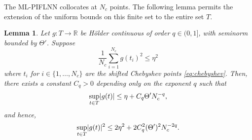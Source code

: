 \documentclass[11pt, a4paper]{article}
\theoremstyle{theoremstyle}
\newtheorem{lemma}[theorem]{Lemma}
\theoremstyle{definitionstyle}
\DeclarePairedDelimiter{\abs}{\lvert}{\rvert}
\begin{document}
The ML-PIFLNN collocates at $N_c$ points. The following lemma permits the extension of the uniform bounds on this finite set to the entire set $T$.
\begin{lemma}\label{lem:collocation_to_continuum}
    Let $g : T \to \mathbb R$ be H\"older continuous of order $q \in (0, 1]$, with seminorm bounded by $\Theta'$. Suppose
    \begin{equation}
        \frac 1{N_c} \sum_{i=1}^{N_c} g(t_i)^2 \leq \eta^2
    \end{equation}
    where $t_i$ for $i \in \{1, \dots , N_c\}$ are the shifted Chebyshev points \eqref{eq:chebyshev}. Then, there exists a constant $C_q > 0$ depending only on the exponent $q$ such that
    \begin{equation}
        \sup_{t \in T} \abs{g(t)} \leq \eta + C_q\Theta'N_c^{-q},
    \end{equation}
    and hence,
    \begin{equation}
        \sup_{t \in T} \abs{g(t)}^2 \leq 2\eta^2 + 2C_q^2(\Theta')^2N_c^{-2q}.
    \end{equation}
\end{lemma}
\end{document}
